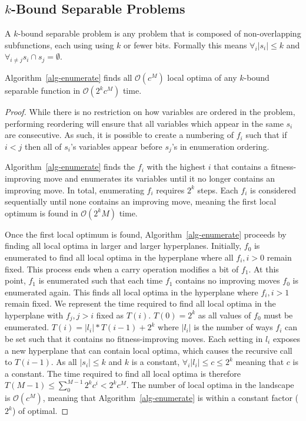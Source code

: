 \documentclass[runningheads,a4paper]{llncs}
\newcommand{\BigO}[1]{$\mathcal{O}{(#1)}$}
\begin{document}
\subsection{$k$-Bound Separable Problems}
A $k$-bound separable problem is any problem that is composed of non-overlapping
subfunctions, each using using $k$ or fewer bits. Formally this means
$\forall_i |s_i| \leq k$ and $\forall_{i \neq j} s_i \cap s_j = \emptyset$.

\begin{theorem}
Algorithm~\ref{alg-enumerate} finds all \BigO{c^{M}} local optima of any $k$-bound separable function
in \BigO{2^kc^{M}} time.
\end{theorem}

\begin{proof}
While there is no restriction on how variables are ordered in the problem,
performing reordering will ensure that
all variables which appear in the same $s_i$ are consecutive.
As such, it is possible to create a numbering of $f_i$ such that if $i < j$ then all of $s_i$'s
variables appear before $s_j$'s in enumeration ordering.

Algorithm~\ref{alg-enumerate} finds the $f_i$ with the highest $i$ that contains a
fitness-improving move and enumerates its variables until it no longer
contains an improving move. In total, enumerating $f_i$ requires $2^k$
steps. Each $f_i$ is considered sequentially until none contains an improving move,
meaning the first local optimum is found in \BigO{2^kM} time.

Once the first local optimum is found, Algorithm~\ref{alg-enumerate} proceeds
by finding all local optima in larger and larger hyperplanes. Initially, $f_0$
is enumerated to find all local optima in the hyperplane where all $f_i, i>0$ remain
fixed. This process ends when a carry operation modifies a bit of $f_1$. At
this point, $f_1$ is enumerated such that each time $f_1$ contains no improving moves
$f_0$ is enumerated again. This finds all local optima in the hyperplane where $f_i, i>1$ remain
fixed. We represent the time required to find all local optima in the hyperplane
with $f_j, j>i$ fixed as $T(i)$. $T(0)=2^k$ as all values of $f_0$ must be enumerated.
$T(i) = |l_i|*T(i-1)+2^k$ where $|l_i|$ is the number of ways $f_i$ can be set such
that it contains no fitness-improving moves.
Each setting in $l_i$ exposes a new hyperplane
that can contain local optima, which causes the recursive call to $T(i-1)$.
As all $|s_i| \leq k$ and $k$ is a
constant, $\forall_i |l_i| \leq c \leq 2^k$ meaning that $c$ is a constant.
The time required to find all local optima is therefore
$T(M-1)\leq \sum_0^{M-1}2^kc^i<2^kc^{M}$.
The number of local optima in the landscape is \BigO{c^{M}}, meaning that Algorithm~\ref{alg-enumerate}
is within a constant factor ($2^k$) of optimal.
\end{proof}
\end{document}
